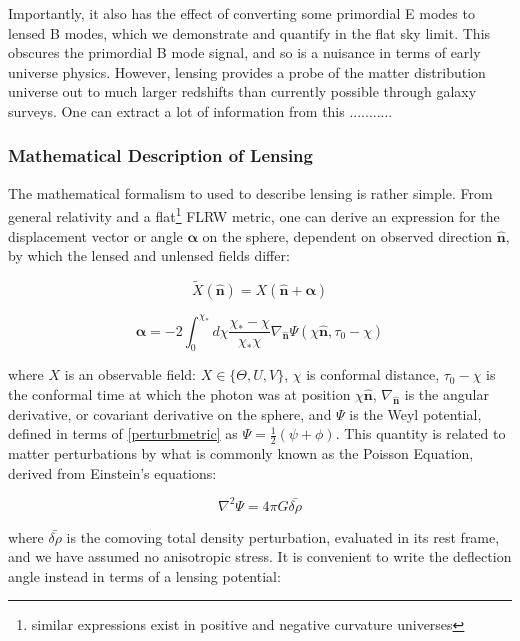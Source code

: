 \documentclass[a4paper,10pt]{article}
\renewcommand{\v}[1]{\mathbf{#1}}
\newcommand{\half}{\frac{1}{2}}
\newcommand{\unit}[1]{\hat{\v{#1}}}
\begin{document}
Importantly, it also has the effect of converting some primordial E modes to lensed B modes, which we demonstrate and quantify in the flat sky limit. This obscures the primordial B mode signal, and so is a nuisance in terms of early universe physics. However, lensing provides a probe of the matter distribution universe out to much larger redshifts than currently possible through galaxy surveys. One can extract a lot of information from this ...........

\subsubsection{Mathematical Description of Lensing}

The mathematical formalism to used to describe lensing is rather simple. From general relativity and a flat\footnote{similar expressions exist in positive and negative curvature universes} FLRW metric, one can derive an expression for the displacement vector or angle $\v{\alpha}$ on the sphere, dependent on observed direction $\unit{n}$, by which the lensed and unlensed fields differ:

\begin{equation}
\tilde{X}(\unit{n}) = X(\unit{n}+\v{\alpha})
\end{equation}

\begin{equation}
\v{\alpha} = -2 \int_0^{\chi_*}d\chi \frac{\chi_*-\chi}{\chi_*\chi}\nabla_{\unit{n}}\Psi(\chi\unit{n},\tau_0-\chi)
\end{equation}

where $X$ is an observable field: $X \in \{ \Theta, U, V\}$, $\chi$ is conformal distance, $\tau_0-\chi$ is the conformal time at which the photon was at position $\chi\unit{n}$, $\nabla_{\unit{n}}$ is the angular derivative, or covariant derivative on the sphere, and $\Psi$ is the Weyl potential, defined in terms of \ref{perturbmetric} as $\Psi =\half (\psi+\phi)$. This quantity is related to matter perturbations by what is commonly known as the Poisson Equation, derived from Einstein's equations:

\begin{equation}
\nabla^2\Psi = 4\pi G\bar{\delta\rho}
\end{equation}

where $\bar{\delta\rho}$ is the comoving total density perturbation, evaluated in its rest frame, and we have assumed no anisotropic stress. It is convenient to write the deflection angle instead in terms of a lensing potential:
\end{document}

